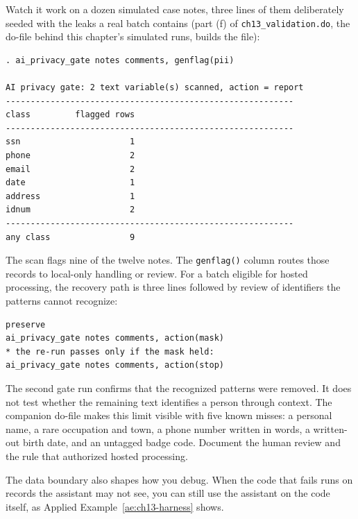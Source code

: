 Watch it work on a dozen simulated case notes, three lines of them deliberately seeded with the leaks a real batch contains (part (f) of \texttt{ch13\_validation.do}, the do-file behind this chapter's simulated runs, builds the file):
\par
{\footnotesize
\begin{verbatim}
. ai_privacy_gate notes comments, genflag(pii)

AI privacy gate: 2 text variable(s) scanned, action = report
----------------------------------------------------------
class         flagged rows
----------------------------------------------------------
ssn                      1
phone                    2
email                    2
date                     1
address                  1
idnum                    2
----------------------------------------------------------
any class                9
\end{verbatim}
}
The scan flags nine of the twelve notes. The \texttt{genflag()} column routes those records to local-only handling or review. For a batch eligible for hosted processing, the recovery path is three lines followed by review of identifiers the patterns cannot recognize:
\par
{\footnotesize
\begin{verbatim}
preserve
ai_privacy_gate notes comments, action(mask)
* the re-run passes only if the mask held:
ai_privacy_gate notes comments, action(stop)
\end{verbatim}
}
The second gate run confirms that the recognized patterns were removed. It does not test whether the remaining text identifies a person through context. The companion do-file makes this limit visible with five known misses: a personal name, a rare occupation and town, a phone number written in words, a written-out birth date, and an untagged badge code. Document the human review and the rule that authorized hosted processing.

The data boundary also shapes how you debug. When the code that fails runs on records the assistant may not see, you can still use the assistant on the code itself, as Applied Example~\ref{ae:ch13-harness} shows.

